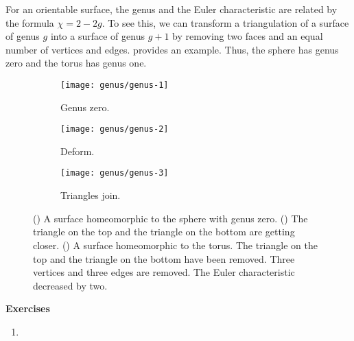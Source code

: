 For an orientable surface, the genus and the Euler characteristic are related by
the formula $\chi=2-2g$. To see this, we can transform a triangulation of a surface of
genus $g$ into a surface of genus $g+1$ by removing two faces and an equal number
of vertices and edges.  provides an example.
Thus, the sphere has genus zero and the torus has genus one.


\begin{figure}[htb]
        \centering
        \begin{subfigure}[b]{0.2\textwidth}
        \texttt{[image: genus/genus-1]}
        \caption{Genus zero.}
          \label{fig:initial-sphere}
        \end{subfigure}
          \hspace{.5cm}
         \begin{subfigure}[b]{0.2\textwidth}
        \texttt{[image: genus/genus-2]}
        \caption{Deform.}
        \label{fig:decending-faces}
        \end{subfigure}
          \hspace{.5cm}
         \begin{subfigure}[b]{0.2\textwidth}
        \texttt{[image: genus/genus-3]}
        \caption{Triangles join.}
        \label{fig:faces-join}
        \end{subfigure}
		\caption{() A surface homeomorphic to the sphere with genus zero.
		() The triangle on the top and the triangle on the bottom are getting
		closer. ()  A surface homeomorphic to the torus. The triangle on the top
		and the triangle on the bottom have been removed. Three vertices and three edges are				removed. The Euler characteristic decreased by two.
		\label{fig:genus}}
\end{figure}

\noindent \textbf{Exercises}


\begin{enumerate}
	\item 
	
\end{enumerate}

\pagebreak